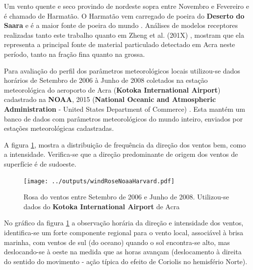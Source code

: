 Um vento quente e seco provindo de nordeste sopra entre Novembro e Fevereiro 
e é chamado de Harmatão. O Harmatão vem carregado de poeira do 
\textbf{Deserto do Saara} e é a maior fonte de poeira do mundo
\citep{breuning2005}. Análises de modelos receptores realizadas tanto este trabalho quanto em Zheng et al. (201X)%
, mostram que ela representa a principal fonte de material particulado detectado em Acra neste período, tanto na fração fina quanto na grossa.

%

Para avaliação do perfil dos parâmetros meteorológicos locais
utilizou-se dados horários de Setembro de 2006 à Junho de 2008 
coletados na estação meteorológica do aeroporto de Acra 
(\textbf{Kotoka International Airport}) cadastrado na \textbf{NOAA}, 2015 (\textbf{National Oceanic 
and Atmospheric Administration} - United States Department of Commerce)%
. Esta mantém um banco de dados com parâmetros 
meteorológicos do mundo inteiro, enviados por estações meteorológicas 
cadastradas.

A figura \ref{fg:rosaCompleta}, 
mostra a distribuição de frequência da direção dos ventos bem, como a 
intensidade. Verifica-se que a direção predominante de origem dos ventos de superfície
é de sudoeste. 

\begin{figure}[H]
  \centering
  \texttt{[image: ../outputs/windRoseNoaaHarvard.pdf]}
  \caption{Rosa do ventos entre
           Setembro de 2006 e Junho de 2008. Utilizou-se dados 
           do \textbf{Kotoka International Airport} de Acra 
           \label{fg:rosaCompleta}}
\end{figure}%

No gráfico da figura \ref{fg:rosaCompleta}%
 a observação horária da direção e 
intensidade dos ventos, identifica-se um forte componente regional para o vento local, associável à brisa marinha, com ventos de sul (do oceano) quando o sol encontra-se alto,%
 mas deslocando-se à oeste na medida que as horas avançam (deslocamento à direita do sentido do movimento - ação típica do efeito de Coriolis no hemisfério Norte). 

